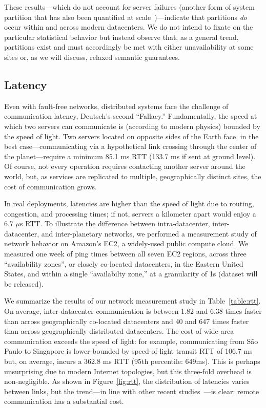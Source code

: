 These results---which do not account for server failures (another form
of system partition that has also been quantified at
scale~\cite{google-availability})---indicate that partitions
\textit{do} occur within and across modern datacenters. We do not
intend to fixate on the particular statistical behavior but instead
observe that, as a general trend, partitions exist and must
accordingly be met with either unavailability at some sites or, as we
will discuss, relaxed semantic guarantees.

\subsection{Latency}

Even with fault-free networks, distributed systems face the challenge
of communication latency, Deutsch's second ``Fallacy.'' Fundamentally,
the speed at which two servers can communicate is (according to modern
physics) bounded by the speed of light. Two servers located on
opposite sides of the Earth face, in the best case---communicating via
a hypothetical link crossing through the center of the
planet---require a minimum 85.1 ms RTT (133.7 ms if sent at ground
level). Of course, not every operation requires contacting another
server around the world, but, as services are replicated to multiple,
geographically distinct sites, the cost of communication grows.

In real deployments, latencies are higher than the speed of light due
to routing, congestion, and processing times; if not, servers a
kilometer apart would enjoy a 6.7 $\mu$s RTT. To illustrate the
difference between intra-datacenter, inter-datacenter, and
inter-planetary networks, we performed a measurement study of network
behavior on Amazon's EC2, a widely-used public compute cloud. We
measured one week of ping times between all seven EC2 regions, across
three ``availability zones'', or closely co-located datacenters, in
the Eastern United States, and within a single ``availabilty zone,''
at a granularity of 1s (dataset will be released).

We summarize the results of our network measurement study in
Table~\ref{table:rtt}. On average, inter-datacenter communication is
between 1.82 and 6.38 times faster than across geographically
co-located datacenters and 40 and 647 times faster than across
geographically distributed datacenters. The cost of wide-area
communication exceeds the speed of light: for example, communicating
from S\~{a}o Paulo to Singapore is lower-bounded by speed-of-light
transit RTT of 106.7 ms but, on average, incurs a 362.8 ms RTT (95th
percentile: 649ms). This is perhaps unsurprising due to modern
Internet topologies, but this three-fold overhead is
non-negligible. As shown in Figure~\ref{fig:rtt}, the distribution of
latencies varies between links, but the trend---in line with other
recent studies~\cite{redblue, mdcc}---is clear: remote communication
has a substantial cost.

